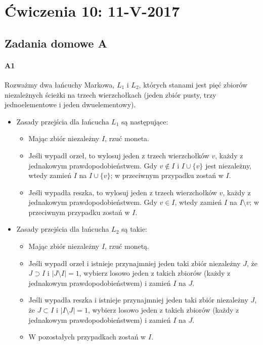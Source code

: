 \section{Ćwiczenia 10: 11-V-2017}
\subsection{Zadania domowe A}
\paragraph{A1} Rozważmy dwa łańcuchy Markowa, $L_1$ i $L_2$, których stanami jest pięć zbiorów niezależnych ścieżki na trzech wierzchołkach (jeden zbiór pusty, trzy jednoelementowe i jeden dwuelementowy).
\begin{itemize}
\item Zasady przejścia dla łańcucha $L_1$ są następujące:
\begin{itemize}
\item Mając zbiór niezależny $I$, rzuć moneta.
\item Jeśli wypadł orzeł, to wylosuj jeden z trzech wierzchołków $v$, każdy z jednakowym prawdopodobieństwem. Gdy $v \not \in I$ i $I \cup \{v\}$ jest niezależny, wtedy zamień $I$ na $I \cup \{v\}$; w przeciwnym przypadku zostań w $I$.
\item Jeśli wypadła reszka, to wylosuj jeden z trzech wierzchołków $v$, każdy z jednakowym prawdopodobieństwem. Gdy $v \in I$, wtedy zamień $I$ na $I \setminus v$; w przeciwnym przypadku zostań w $I$.
\end{itemize}
\item  Zasady przejścia dla łańcucha $L_2$ są takie:
\begin{itemize}
\item  Mając zbiór niezależny $I$, rzuć monetą.
\item Jeśli wypadł orzeł i istnieje przynajmniej jeden taki zbiór niezależny $J$, że $J \supset  I$ i $|J \setminus I| = 1$, wybierz losowo jeden z takich zbiorów (każdy z jednakowym prawdopodobieństwem) i zamień $I$ na $J$.
\item Jeśli wypadła reszka i istnieje przynajmniej jeden taki zbiór niezależny $J$, że $J \subset I$ i $|I \setminus J| = 1$, wybierz losowo jeden z takich zbiorów (każdy z jednakowym prawdopodobieństwem) i zamień $I$ na $J$.
\item W pozostałych przypadkach zostań w $I$.
\end{itemize}
\end{itemize}
